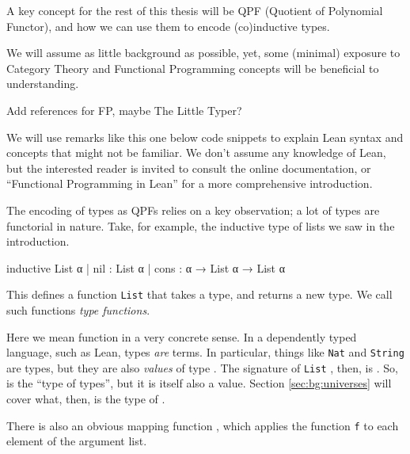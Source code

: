 \documentclass[titlepage]{report}
\newenvironment{remark}{%
\begin{framed}
\begin{trivlist}
    \item[\hskip \labelsep {\bfseries Remark:}]}%
{%
\end{trivlist}%
\end{framed}
}
\newenvironment{todo}{%
\definecolor{shadecolor}{HTML}{F8E0E0}%
\begin{shaded}%
\begin{trivlist}                         
    \item[\hskip \labelsep {\bfseries Todo:}]}{\end{trivlist}\end{shaded}}
\newcommand\lean[1]{{%
\def\leanmode{1}%
\small \texttt{#1}%
\undef\leanmode%
}}
\newcommand\Type{\leanm{Type}}
\begin{document}
A key concept for the rest of this thesis will be QPF (Quotient of Polynomial Functor), and how we can use them to encode (co)inductive types.

We will assume as little background as possible, yet, some (minimal) exposure to Category Theory and Functional Programming concepts will be beneficial to understanding. \cite{awodeyCategoryTheory2010}\cite{milewskiCategoryTheoryProgrammers}\cite{christiansenFunctionalProgrammingLean}

\begin{todo}
    Add references for FP, maybe The Little Typer?
\end{todo}

\begin{remark}
    We will use remarks like this one below code snippets to explain Lean syntax and concepts that might not be familiar. We don't assume any knowledge of Lean, but the interested reader is invited to consult the online documentation, or ``Functional Programming in Lean'' for a more comprehensive introduction.
    \cite{avigadTheoremProvingLean}\cite{christiansenFunctionalProgrammingLean}
\end{remark}



The encoding of types as QPFs relies on a key observation; a lot of types are functorial in nature.
Take, for example, the inductive type of lists we saw in the introduction.
\begin{leancode}
    inductive List α 
    | nil  : List α
    | cons : α → List α → List α
\end{leancode}

This defines a function \lean{List} that takes a type, and returns a new type.
We call such functions \emph{type functions}.

\begin{remark}
    Here we mean function in a very concrete sense. In a dependently typed language, such as Lean, types \emph{are} terms. In particular, things like \lean{Nat} and \lean{String} are types, but they are also \emph{values} of type \Type.
    The signature of \lean{List}, then, is .
    So, \Type{} is the ``type of types'', but it is itself also a value.
    Section \ref{sec:bg:universes} will cover what, then, is the type of \Type.
\end{remark}

There is also an obvious mapping function , 
which applies the function \lean{f} to each element of the argument list.
\end{document}
